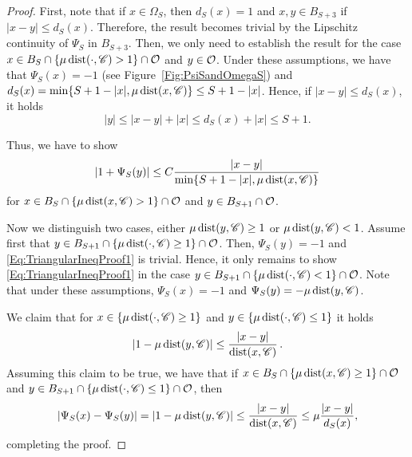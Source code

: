 \begin{proof}
First, note that if $x\in \Omega_S$, then $d_S(x)=1$ and $x,y\in B_{S+3}$ if $|x-y|\leq d_S(x)$. Therefore, the result becomes trivial by the Lipschitz continuity of $\Psi_S$ in $B_{S+3}$. Then, we only need to establish the result for the case $x\in B_S\cap \{\mu \operatorname{dist}(\cdot,\mathscr{C})> 1\} \cap \mathcal{O}$ and $y\in \mathcal{O}$. Under these assumptions, we have that $\Psi_S(x)=-1$ (see Figure~\ref{Fig:PsiSandOmegaS}) and $d_S(x) = \min\{S+1-|x|,\mu \operatorname{dist}(x,\mathscr{C})\} \leq S+1-|x|$. Hence, if $|x-y|\leq d_S(x)$, it holds
$$
 |y|\leq |x-y| + |x| \leq d_S(x)+|x| \leq S+1. 
$$

Thus, we have to show
\begin{equation}
\label{Eq:TriangularIneqProof1}
	|1+\Psi_S(y)|\leq C\dfrac{|x-y|}{\min\{S+1-|x|,\mu \operatorname{dist}(x,\mathscr{C})\}}
\end{equation}
for $x\in B_S\cap \{\mu\operatorname{dist}(x,\mathscr{C})>1\} \cap \mathcal{O}$ and $y \in B_{S+1}\cap \mathcal{O}$.

Now we distinguish two cases, either $\mu\operatorname{dist}(y,\mathscr{C})\geq 1$ or $\mu \operatorname{dist}(y,\mathscr{C})< 1$. Assume first that $y\in B_{S+1} \cap \{\mu \operatorname{dist}(\cdot,\mathscr{C})\geq 1\}\cap \mathcal{O}$. Then, $\Psi_S(y)=-1$ and \eqref{Eq:TriangularIneqProof1} is trivial. Hence, it only remains to show \eqref{Eq:TriangularIneqProof1} in the case $y\in B_{S+1} \cap \{\mu \operatorname{dist}(\cdot,\mathscr{C}) < 1\}\cap \mathcal{O}$. Note that under these assumptions, $\Psi_S(x)=-1$ and $\Psi_S(y)=-\mu \operatorname{dist}(y,\mathscr{C})$. 

We claim that for $x \in \{\mu \operatorname{dist}(\cdot,\mathscr{C})\geq 1\}$ and $y \in \{\mu \operatorname{dist}(\cdot,\mathscr{C})\leq 1\}$ it holds
\begin{equation}
\label{Eq:TriangularIneqProof2}
|1-\mu \operatorname{dist}(y,\mathscr{C})|\leq \dfrac{|x-y|}{\operatorname{dist}(x,\mathscr{C})}\,.
\end{equation}
Assuming this claim to be true, we have that if $x\in B_S\cap \{\mu \operatorname{dist}(x,\mathscr{C})\geq 1\} \cap \mathcal{O}$ and $y\in B_{S+1} \cap \{\mu \operatorname{dist}(\cdot,\mathscr{C})\leq 1\}\cap \mathcal{O}$, then
$$ 
|\Psi_S(x)-\Psi_S(y)| = |1-\mu \operatorname{dist}(y,\mathscr{C})| \leq \frac{|x-y|}{\operatorname{dist}(x,\mathscr{C})} \leq  \mu \frac{|x-y|}{d_S(x)},
$$
completing the proof.


\end{proof}
